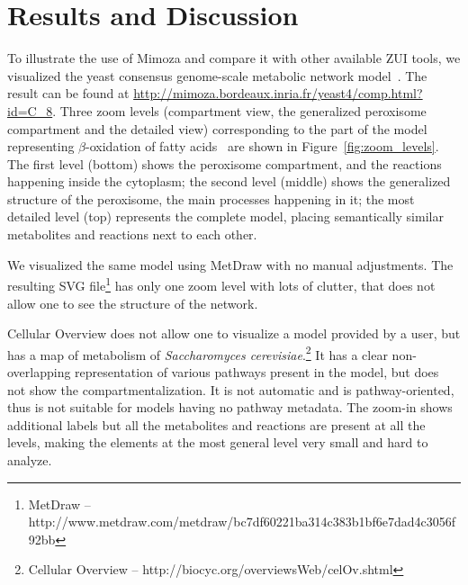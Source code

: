 \documentclass{bmcart}
\begin{document}
\section*{Results and Discussion}
To illustrate the use of Mimoza and compare it with other available ZUI tools, we visualized the yeast consensus genome-scale metabolic network model~\cite{Herrgard2008}. The result can be found at \url{http://mimoza.bordeaux.inria.fr/yeast4/comp.html?id=C_8}. 
Three zoom levels (compartment view, the generalized peroxisome compartment and the detailed view) corresponding to the part of the model representing $\beta$-oxidation of fatty acids~\cite{Metzler01} are shown in Figure~\ref{fig:zoom_levels}. The first level (bottom) shows the peroxisome compartment, and the reactions happening inside the cytoplasm; the second level (middle) shows the generalized structure of the peroxisome, the main processes happening in it; the most detailed level (top) represents the complete model, placing semantically similar metabolites and reactions next to each other.

We visualized the same model using MetDraw with no manual adjustments. The resulting SVG file\footnote{MetDraw -- http://www.metdraw.com/metdraw/bc7df60221ba314c383b1bf6e7dad4c3056f92bb} has only one zoom level with lots of clutter, that does not allow one to see the structure of the network.

Cellular Overview does not allow one to visualize a model provided by a user, but has a map of metabolism of \emph{Saccharomyces cerevisiae}.\footnote{Cellular Overview -- http://biocyc.org/overviewsWeb/celOv.shtml} It has a clear non-overlapping representation of various pathways present in the model, but does not show the compartmentalization. It is not automatic and is pathway-oriented, thus is not suitable for models having no pathway metadata. The zoom-in shows additional labels but all the metabolites and reactions are present at all the levels, making the elements at the most general level very small and hard to analyze.
\end{document}
